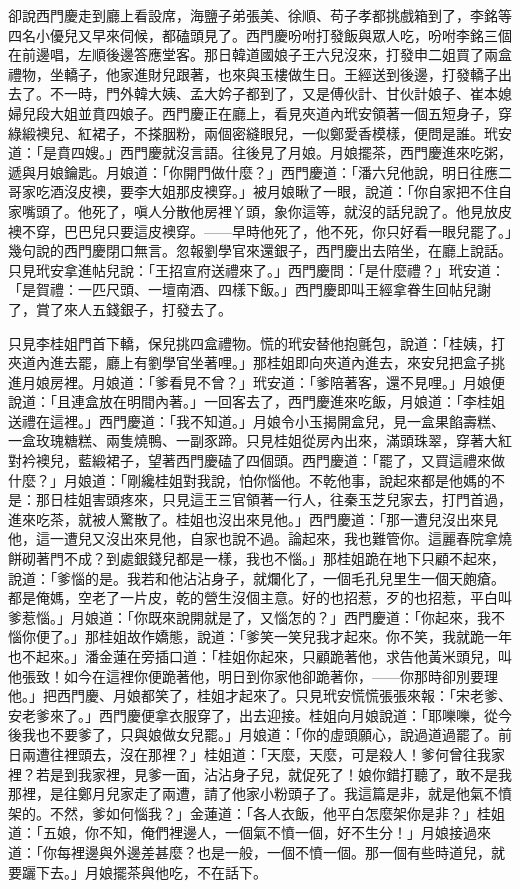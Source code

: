 卻說西門慶走到廳上看設席，海鹽子弟張美、徐順、苟子孝都挑戲箱到了，李銘等四名小優兒又早來伺候，都磕頭見了。西門慶吩咐打發飯與眾人吃，吩咐李銘三個在前邊唱，左順後邊答應堂客。那日韓道國娘子王六兒沒來，打發申二姐買了兩盒禮物，坐轎子，他家進財兒跟著，也來與玉樓做生日。王經送到後邊，打發轎子出去了。不一時，門外韓大姨、孟大妗子都到了，又是傅伙計、甘伙計娘子、崔本媳婦兒段大姐並賁四娘子。西門慶正在廳上，看見夾道內玳安領著一個五短身子，穿綠緞襖兒、紅裙子，不搽胭粉，兩個密縫眼兒，一似鄭愛香模樣，便問是誰。玳安道：「是賁四嫂。」西門慶就沒言語。往後見了月娘。月娘擺茶，西門慶進來吃粥，遞與月娘鑰匙。月娘道：「你開門做什麼？」西門慶道：「潘六兒他說，明日往應二哥家吃酒沒皮襖，要李大姐那皮襖穿。」被月娘瞅了一眼，說道：「你自家把不住自家嘴頭了。他死了，嗔人分散他房裡丫頭，象你這等，就沒的話兒說了。他見放皮襖不穿，巴巴兒只要這皮襖穿。——早時他死了，他不死，你只好看一眼兒罷了。」幾句說的西門慶閉口無言。忽報劉學官來還銀子，西門慶出去陪坐，在廳上說話。只見玳安拿進帖兒說：「王招宣府送禮來了。」西門慶問：「是什麼禮？」玳安道：「是賀禮：一匹尺頭、一壇南酒、四樣下飯。」西門慶即叫王經拿眷生回帖兒謝了，賞了來人五錢銀子，打發去了。

只見李桂姐門首下轎，保兒挑四盒禮物。慌的玳安替他抱氈包，說道：「桂姨，打夾道內進去罷，廳上有劉學官坐著哩。」那桂姐即向夾道內進去，來安兒把盒子挑進月娘房裡。月娘道：「爹看見不曾？」玳安道：「爹陪著客，還不見哩。」月娘便說道：「且連盒放在明間內著。」一回客去了，西門慶進來吃飯，月娘道：「李桂姐送禮在這裡。」西門慶道：「我不知道。」月娘令小玉揭開盒兒，見一盒果餡壽糕、一盒玫瑰糖糕、兩隻燒鴨、一副豕蹄。只見桂姐從房內出來，滿頭珠翠，穿著大紅對衿襖兒，藍緞裙子，望著西門慶磕了四個頭。西門慶道：「罷了，又買這禮來做什麼？」月娘道：「剛纔桂姐對我說，怕你惱他。不乾他事，說起來都是他媽的不是：那日桂姐害頭疼來，只見這王三官領著一行人，往秦玉芝兒家去，打門首過，進來吃茶，就被人驚散了。桂姐也沒出來見他。」西門慶道：「那一遭兒沒出來見他，這一遭兒又沒出來見他，自家也說不過。論起來，我也難管你。這麗春院拿燒餅砌著門不成？到處銀錢兒都是一樣，我也不惱。」那桂姐跪在地下只顧不起來，說道：「爹惱的是。我若和他沾沾身子，就爛化了，一個毛孔兒里生一個天皰瘡。都是俺媽，空老了一片皮，乾的營生沒個主意。好的也招惹，歹的也招惹，平白叫爹惹惱。」月娘道：「你既來說開就是了，又惱怎的？」西門慶道：「你起來，我不惱你便了。」那桂姐故作嬌態，說道：「爹笑一笑兒我才起來。你不笑，我就跪一年也不起來。」潘金蓮在旁插口道：「桂姐你起來，只顧跪著他，求告他黃米頭兒，叫他張致！如今在這裡你便跪著他，明日到你家他卻跪著你，——你那時卻別要理他。」把西門慶、月娘都笑了，桂姐才起來了。只見玳安慌慌張張來報：「宋老爹、安老爹來了。」西門慶便拿衣服穿了，出去迎接。桂姐向月娘說道：「耶嚛嚛，從今後我也不要爹了，只與娘做女兒罷。」月娘道：「你的虛頭願心，說過道過罷了。前日兩遭往裡頭去，沒在那裡？」桂姐道：「天麼，天麼，可是殺人！爹何曾往我家裡？若是到我家裡，見爹一面，沾沾身子兒，就促死了！娘你錯打聽了，敢不是我那裡，是往鄭月兒家走了兩遭，請了他家小粉頭子了。我這篇是非，就是他氣不憤架的。不然，爹如何惱我？」金蓮道：「各人衣飯，他平白怎麼架你是非？」桂姐道：「五娘，你不知，俺們裡邊人，一個氣不憤一個，好不生分！」月娘接過來道：「你每裡邊與外邊差甚麼？也是一般，一個不憤一個。那一個有些時道兒，就要躧下去。」月娘擺茶與他吃，不在話下。

